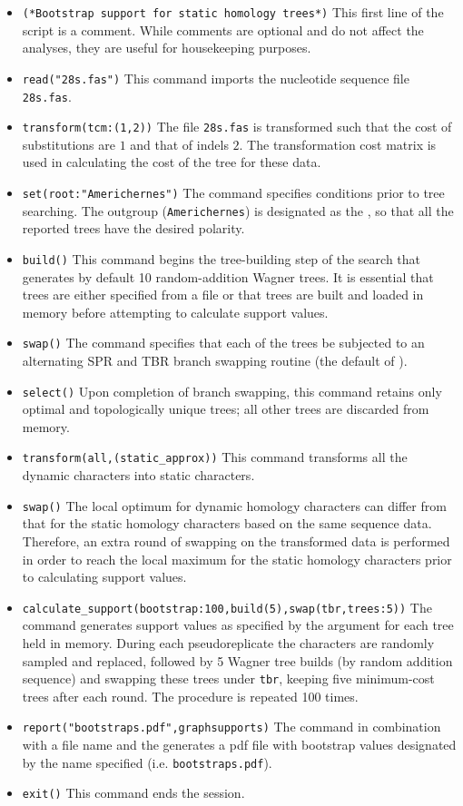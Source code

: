 \begin{itemize}
\item \texttt{(*Bootstrap support for static homology trees*)} This
first line of the script is a comment. While
 comments are optional and do not affect the analyses, they are
 useful for housekeeping purposes.
\item \texttt{read("28s.fas")} This command imports the nucleotide
sequence file \texttt{28s.fas}.  
\item \texttt{transform(tcm:(1,2))} The file \texttt{28s.fas} is 
transformed such that the cost of substitutions are $1$ and that 
of indels $2$.  The transformation cost matrix is used in calculating
 the cost of the tree for these data.  
 \item \texttt{set(root:"Americhernes")} The 
command specifies conditions prior to tree searching. The outgroup
(\texttt{Americhernes}) is designated as the ,
so that all the reported trees have the desired polarity.  
\item \texttt{build()} This command begins the tree-building step of the
search that generates by default 10 random-addition Wagner trees.
It is essential that trees are either specified from a file or that
trees are built and loaded in memory before attempting to calculate
support values.  
\item \texttt{swap()} The  command
specifies that each of the trees be subjected to an alternating SPR
and TBR branch swapping routine (the default of \poy).  
\item \texttt{select()} Upon completion of branch swapping, this command
retains only optimal and topologically unique trees; all other trees
are discarded from memory.  
\item \texttt{transform(all,(static\_approx))} This command transforms 
all the dynamic characters into static characters.  
\item \texttt{swap()} The local optimum for dynamic
homology characters can differ from that for the static homology
characters based on the same sequence data. Therefore, an extra
round of swapping on the transformed data is performed in order to
reach the local maximum for the static homology characters prior
to calculating support values.  
\item \texttt{calculate\_support(bootstrap:100,build(5),swap(tbr,trees:5))} The
 command generates support values
as specified by the  argument for each tree
held in memory. During each pseudoreplicate the characters are
randomly sampled and replaced, followed by 5 Wagner tree builds (by
random addition sequence) and swapping these trees under \texttt{tbr},
keeping five minimum-cost trees after each round. The procedure is
repeated 100 times.  
\item \texttt{report("bootstraps.pdf",graphsupports)} The 
 command in combination with a file name and
the  generates a pdf file with bootstrap
values designated by the name specified (i.e. \texttt{bootstraps.pdf}).
\item \texttt{exit()} This command ends the \poy session.
\end{itemize}

